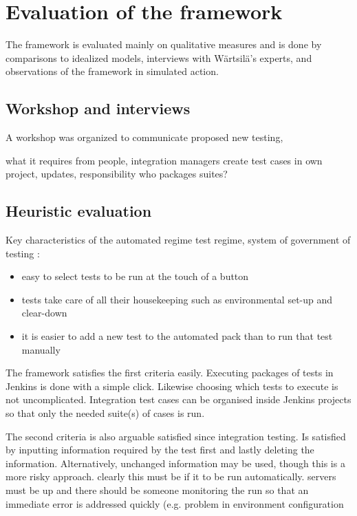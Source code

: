 \documentclass[12pt,a4paper,oneside,pdftex]{report}
\begin{document}
{{\section{Evaluation of the framework}
The framework is evaluated mainly on qualitative measures and is done by comparisons to idealized models, interviews with Wärtsilä's experts, and observations of the framework in simulated action.


\subsection{Workshop and interviews}

A workshop was organized to communicate proposed new testing, 

what it requires from people, integration managers create test cases in own project, updates, responsibility
who packages suites?

\subsection{Heuristic evaluation}

Key characteristics of the automated regime test regime, system of government of testing \citep{fewster1999software}:
\begin{itemize}
\item easy to select tests to be run at the touch of a button
\item tests take care of all their housekeeping such as environmental set-up and clear-down
\item it is easier to add a new test to the automated pack than to run that test manually
\end{itemize}

The framework satisfies the first criteria easily. Executing packages of tests in Jenkins is done with a simple click. Likewise choosing which tests to execute is not uncomplicated. Integration test cases can be organised inside Jenkins projects so that only the needed suite(s) of cases is run.

The second criteria is also arguable satisfied since integration testing. Is satisfied by inputting information required by the test first and lastly deleting the information. Alternatively, unchanged information may be used, though this is a more risky approach. clearly this must be if it to be run automatically. servers must be up and there should be someone monitoring the run so that an immediate error is addressed quickly (e.g. problem in environment configuration

}}
\end{document}
